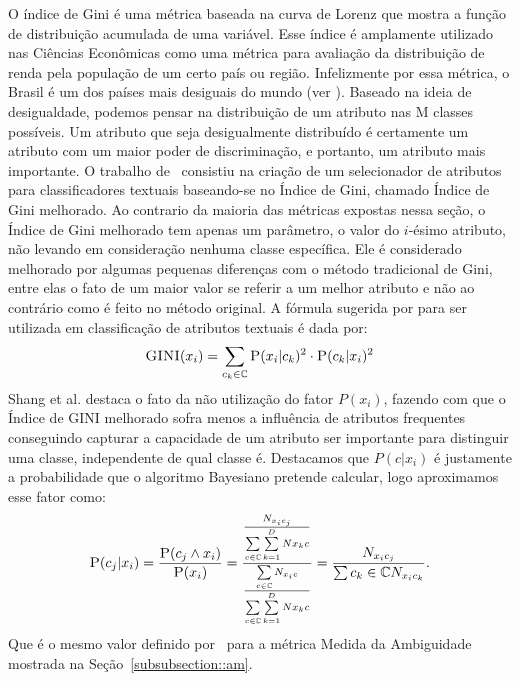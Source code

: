 O índice de Gini é uma métrica baseada na curva de Lorenz que mostra a função de distribuição acumulada de uma variável. Esse índice é amplamente utilizado nas Ciências Econômicas como uma métrica para avaliação da distribuição de renda pela população de um certo país ou região. Infelizmente por essa métrica, o Brasil é um dos países mais desiguais do mundo (ver \cite{cia-gini}). 
Baseado na ideia de desigualdade, podemos pensar na distribuição de um atributo nas M classes possíveis. Um atributo que seja desigualmente distribuído é certamente um atributo com um maior poder de discriminação, e portanto, um atributo mais importante. O trabalho de~\cite{Shang07} consistiu na criação de um selecionador de atributos para classificadores textuais baseando-se no Índice de Gini, chamado Índice de Gini melhorado. Ao contrario da maioria das métricas expostas nessa seção, o Índice de Gini melhorado tem apenas um parâmetro, o valor do $i$-ésimo atributo, não levando em consideração nenhuma classe específica. Ele é considerado melhorado por algumas pequenas diferenças com o método tradicional de Gini, entre elas o fato de um maior valor se referir a um melhor atributo e não ao contrário como é feito no método original. A fórmula sugerida por \cite{Shang07} para ser utilizada em classificação de atributos textuais é dada por:
\begin{equation}\label{eqn::gini}
 \textsc{GINI}(x_i) = \sum\limits_{c_k \in \mathbb{C}} \textsc{P}(x_i|c_k)^2 \cdot \textsc{P}(c_k|x_i)^2
\end{equation}
Shang et al. destaca o fato da não utilização do fator $P(x_i)$, fazendo com que o Índice de GINI melhorado sofra menos a influência de atributos frequentes conseguindo capturar a capacidade de um atributo ser importante para distinguir uma classe, independente de qual classe é. Destacamos que $P(c|x_i)$ é justamente a probabilidade que o algoritmo Bayesiano pretende calcular, logo aproximamos esse fator como:
\begin{equation}\label{eqn::gini}
 \textsc{P}(c_j|x_i) = \frac{ \textsc{P}(c_j \wedge x_i) } {\textsc{P}(x_i) } = \frac{ \frac{ N_{x_ic_j}}{  \sum\limits_{c \in \mathbb{C}} \sum\limits_{k=1}^{D} {Nx_kc}  } } { \frac{\sum\limits_{c \in \mathbb{C}} N_{x_ic}}{ \sum\limits_{c \in \mathbb{C}} \sum\limits_{k=1}^{D} {Nx_kc}}} = \frac{ N_{x_{i}c_{j}}}{\sum\limits{c_k \in \mathbb{C}} N_{x_{i}c_{k}}}.
\end{equation}
Que é o mesmo valor definido por~\cite{Mengle08} para a métrica Medida da Ambiguidade mostrada na Seção~\ref{subsubsection::am}.

